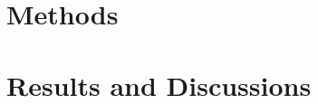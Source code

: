 

%

\section{Methods}
\label{sec:methods}



\cite{cui2018a}
\section{Results and Discussions}
\label{sec:results} 